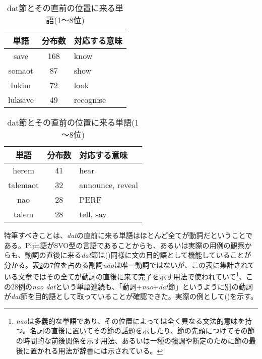 \begin{table}[h]
  \caption{dat節とその直前の位置に来る単語(1～8位)}
  \label{tb:datl1}
  \begin{minipage}{0.5\hsize}
  \begin{center}
    \begin{tabular}{|c||c|l|} \hline
      単語 & 分布数 & 対応する意味 \\ \hline \hline
      save & 168 & know\\ \hline
      somaot & 87 & show\\ \hline
      lukim & 72 & look\\ \hline
      luksave & 49 & recognise\\ \hline
    \end{tabular}
  \end{center}
  \end{minipage}
  \begin{minipage}{0.5\hsize}
    \begin{center}
      \begin{tabular}{|c||c|l|} \hline
        単語 & 分布数 & 対応する意味 \\ \hline \hline
        herem & 41 & hear \\ \hline
        talemaot & 32 & announce, reveal\\ \hline
        nao & 28 & PERF\\ \hline
        talem & 28 & tell, say\\ \hline
      \end{tabular}
    \end{center}
  \end{minipage}
\end{table}

特筆すべきことは、\textit{dat}の直前に来る単語はほとんど全てが動詞だということである。Pijin語がSVO型の言語であることからも、あるいは実際の用例の観察からも、動詞の直後に来る\textit{dat}節は()同様に文の目的語として機能していることが分かる。表\ref{tb:datl1}の7位を占める副詞\textit{nao}は唯一動詞ではないが、この表に集計されている文章ではその全てが動詞の直後に来て完了を示す用法で使われていて\footnote{\textit{nao}は多義的な単語であり、その位置によっては全く異なる文法的意味を持つ。名詞の直後に置いてその節の話題を示したり、節の先頭につけてその節の時間的な前後関係を示す用法、あるいは一種の強調や断定のために節の最後に置かれる用法が辞書\citep[145]{dictionary}には示されている。}、この28例の\textit{nao dat}という単語連続も、「動詞+\textit{nao}+\textit{dat}節」というように別の動詞が\textit{dat}節を目的語として取っていることが確認できた。実際の例として()を示す。


